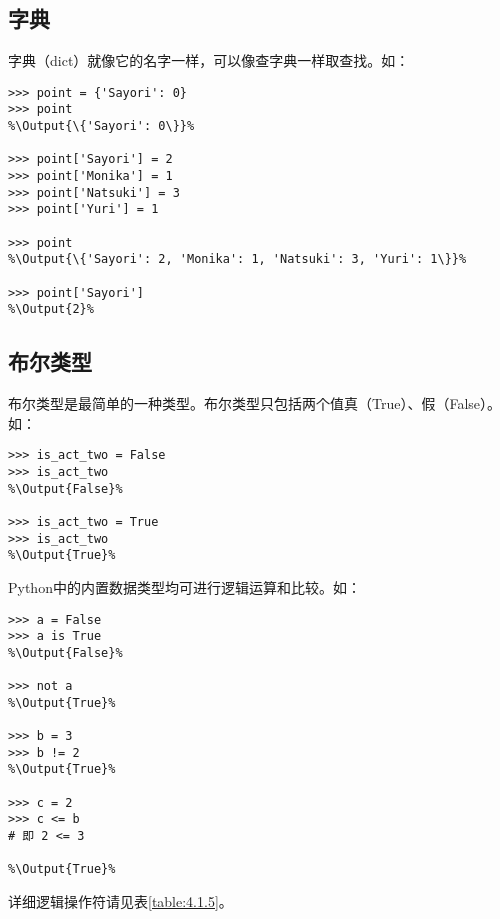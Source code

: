 \documentclass[../../Main.tex]{subfiles}
\begin{document}
\subsection{字典}
字典（dict）就像它的名字一样，可以像查字典一样取查找。如：
\begin{lstlisting}
>>> point = {'Sayori': 0}
>>> point
%\Output{\{'Sayori': 0\}}%

>>> point['Sayori'] = 2
>>> point['Monika'] = 1
>>> point['Natsuki'] = 3
>>> point['Yuri'] = 1

>>> point
%\Output{\{'Sayori': 2, 'Monika': 1, 'Natsuki': 3, 'Yuri': 1\}}%

>>> point['Sayori']
%\Output{2}%
\end{lstlisting}

\subsection{布尔类型}
布尔类型是最简单的一种类型。布尔类型只包括两个值真（True）、假（False）。如：
\begin{lstlisting}
>>> is_act_two = False
>>> is_act_two
%\Output{False}%

>>> is_act_two = True
>>> is_act_two
%\Output{True}%
\end{lstlisting}

Python中的内置数据类型均可进行逻辑运算和比较。如：
\begin{lstlisting}
>>> a = False
>>> a is True
%\Output{False}%

>>> not a
%\Output{True}%

>>> b = 3
>>> b != 2
%\Output{True}%

>>> c = 2
>>> c <= b
# 即 2 <= 3

%\Output{True}%
\end{lstlisting}
详细逻辑操作符请见表\ref{table:4.1.5}。
\end{document}

